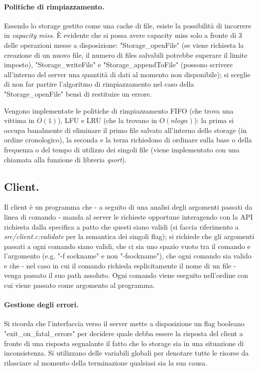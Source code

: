 \documentclass[11pt, italian, openany]{book}
\begin{document}
\begin{sloppypar}
\paragraph*{Politiche di rimpiazzamento.}
Essendo lo storage gestito come una cache di file, esiste la possibilit\`a di incorrere in \textit{capacity miss}.
\`E evidente che si possa avere capacity miss solo a fronte di 3 delle operazioni messe a disposizione:
"Storage\_openFile" (se viene richiesta la creazione di un nuovo file, il numero di files salvabili potrebbe superare il limite
imposto), "Storage\_writeFile" e "Storage\_appendToFile" (possono scrivere all'interno del server una quantit\`a di dati
al momento non disponibile); si sceglie di non far partire l'algoritmo di rimpiazzamento nel caso della "Storage\_openFile"
bens\`i di restituire un errore.

Vengono implementate le politiche di rimpiazzamento FIFO (che trova una vittima in \(O(1)\)), LFU e LRU (che la trovano in
\(O(nlogn)\)): la prima si occupa banalmente di eliminare il primo file salvato all'interno dello storage (in ordine cronologico),
la seconda e la terza richiedono di ordinare sulla base o della frequenza o del tempo di utilizzo dei singoli file (viene
implementato con una chiamata alla funzione di libreria \textit{qsort}).

\subsection{Client.}
Il client \`e un programma che - a seguito di una analisi degli argomenti passati da linea di comando - manda al server le
richieste opportune interagendo con la API richiesta dalla specifica a patto che questi siano validi (si faccia riferimento a 
\textit{src/client.c:validate} per la semantica dei singoli flag); si richiede che gli argomenti passati a ogni comando siano
validi, che ci sia uno spazio vuoto tra il comando e l'argomento (e.g. "-f sockname" e non "-fsockname"), che ogni comando sia
valido e che - nel caso in cui il comando richieda esplicitamente il nome di un file - venga passato il suo path assoluto.
Ogni comando viene eseguito nell'ordine con cui viene passato come argomento al programma.

\paragraph*{Gestione degli errori.}
Si ricorda che l'interfaccia verso il server mette a disposizione un flag booleano "exit\_on\_fatal\_errors" per decidere quale
debba essere la risposta del client a fronte di una risposta segnalante il fatto che lo storage sia in una situazione di
inconsistenza. Si utilizzano delle variabili globali per denotare tutte le risorse da rilasciare al momento della terminazione
qualsiasi sia la sua causa.


\end{sloppypar}
\end{document}
